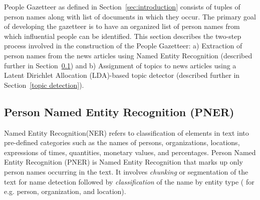 People Gazetteer as defined in Section~\ref{sec:introduction} consists of tuples of person names along with list of documents in which they occur. The primary goal of developing the gazetteer is to have an organized list of person names from which influential people can be identified.
This section describes the two-step process involved in the construction of the People Gazetteer:
a) Extraction of person names from the news articles using Named Entity Recognition (described further in Section~\ref{ner}) and
b) Assignment of topics to news articles using a Latent Dirichlet Allocation (LDA)-based topic detector (described further in  Section~\ref{topic detection}).

\subsection{Person Named Entity Recognition (PNER)}
\label{ner}

\noindent Named Entity Recognition(NER) refers to classification of elements in text into pre-defined categories such as the names of persons, organizations, locations, expressions of times, quantities, monetary values, and percentages. 
Person Named Entity Recognition (PNER) is Named Entity Recognition that marks up only person names occurring in the text. It involves \emph{chunking} or segmentation of  the text for name detection followed by \emph{classification} of the name by entity type ( for e.g. person, organization, and location).


